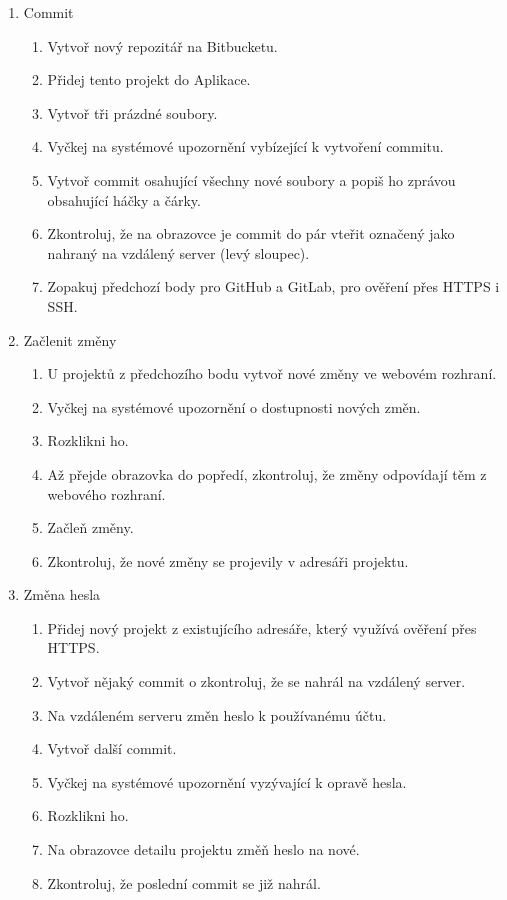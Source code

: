 \begin{enumerate}
	\item Commit
	\begin{enumerate}
		\item Vytvoř nový repozitář na Bitbucketu.
		\item Přidej tento projekt do Aplikace.
		\item Vytvoř tři prázdné soubory.
		\item Vyčkej na systémové upozornění vybízející k vytvoření commitu.
		\item Vytvoř commit osahující všechny nové soubory a popiš ho zprávou obsahující háčky a čárky.
		\item Zkontroluj, že na obrazovce  je commit do pár vteřit označený jako nahraný na vzdálený server (levý sloupec).
		\item Zopakuj předchozí body pro GitHub a GitLab, pro ověření přes HTTPS i SSH.
	\end{enumerate}
	\item Začlenit změny
	\begin{enumerate}
		\item U projektů z předchozího bodu vytvoř nové změny ve webovém rozhraní.
		\item Vyčkej na systémové upozornění o dostupnosti nových změn.
		\item Rozklikni ho.
		\item Až přejde obrazovka  do popředí, zkontroluj, že změny odpovídají těm z webového rozhraní.
		\item Začleň změny.
		\item Zkontroluj, že nové změny se projevily v adresáři projektu.
	\end{enumerate}
	\item Změna hesla
	\begin{enumerate}
		\item Přidej nový projekt z existujícího adresáře, který využívá ověření přes HTTPS.
		\item Vytvoř nějaký commit o zkontroluj, že se nahrál na vzdálený server.
		\item Na vzdáleném serveru změn heslo k používanému účtu.
		\item Vytvoř další commit.
		\item Vyčkej na systémové upozornění vyzývající k opravě hesla.
		\item Rozklikni ho.
		\item Na obrazovce detailu projektu změň heslo na nové.
		\item Zkontroluj, že poslední commit se již nahrál.

\end{enumerate}
\end{enumerate}
